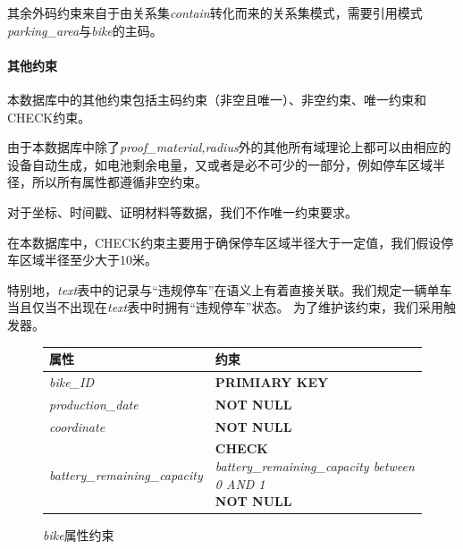 其余外码约束来自于由关系集\textit{contain}转化而来的关系集模式，需要引用模式\textit{parking\_area}与\textit{bike}的主码。

\paragraph{其他约束}
本数据库中的其他约束包括主码约束（非空且唯一）、非空约束、唯一约束和CHECK约束。

由于本数据库中除了\textit{proof\_material,radius}外的其他所有域理论上都可以由相应的设备自动生成，如电池剩余电量，又或者是必不可少的一部分，例如停车区域半径，所以所有属性都遵循非空约束。

对于坐标、时间戳、证明材料等数据，我们不作唯一约束要求。

在本数据库中，CHECK约束主要用于确保停车区域半径大于一定值，我们假设停车区域半径至少大于10米。

特别地，\textit{text}表中的记录与“违规停车”在语义上有着直接关联。我们规定一辆单车当且仅当不出现在\textit{text}表中时拥有“违规停车”状态。
为了维护该约束，我们采用触发器。

\begin{figure}[!htp]
      \centering
      \caption{\textit{bike}属性约束}
      \label{contraint:bike}
      \begin{tabular}{ll}\toprule
        属性&约束\\\midrule
       \textit{bike\_ID}&\textbf{PRIMIARY KEY}\\
       \textit{production\_date}&\textbf{NOT NULL}\\
       \textit{coordinate}&\textbf{NOT NULL}\\
       \textit{battery\_remaining\_capacity}&\makecell[l]{\textbf{CHECK} \textit{battery\_remaining\_capacity between 0 AND 1}\\\textbf{NOT NULL}}\\
       \bottomrule
      \end{tabular}
\end{figure}

